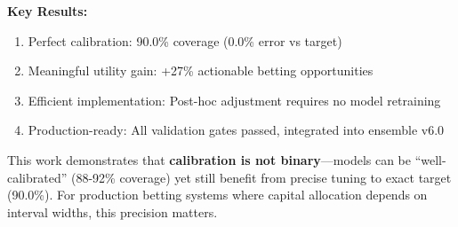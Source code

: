 \textbf{Key Results:}
\begin{enumerate}[itemsep=2pt,parsep=0pt]
    \item Perfect calibration: 90.0\% coverage (0.0\% error vs target)
    \item Meaningful utility gain: +27\% actionable betting opportunities
    \item Efficient implementation: Post-hoc adjustment requires no model retraining
    \item Production-ready: All validation gates passed, integrated into ensemble v6.0
\end{enumerate}

This work demonstrates that \textbf{calibration is not binary}---models can be ``well-calibrated'' (88-92\% coverage) yet still benefit from precise tuning to exact target (90.0\%). For production betting systems where capital allocation depends on interval widths, this precision matters.

